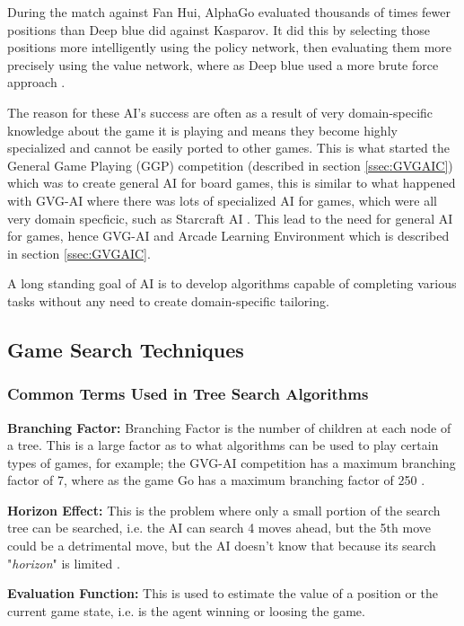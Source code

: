 \documentclass[journal]{IEEEtran}
\begin{document}
		During the match against Fan Hui, AlphaGo evaluated thousands of times fewer positions than Deep blue did against Kasparov. It did this by selecting those positions more intelligently using the policy network, then evaluating them more precisely using the value network, where as Deep blue used a more brute force approach \cite{silver2016mastering, DeepBlue}.

		The reason for these AI's success are often as a result of very domain-specific knowledge about the game it is playing and means they become highly specialized and cannot be easily ported to other games. 
		This is what started the General Game Playing (GGP) competition (described in section \ref{ssec:GVGAIC}) which was to create general AI for board games, this is similar to what happened with GVG-AI where there was lots of specialized AI for games, which were all very domain specficic, such as Starcraft AI \cite{ontanon2013survey, hingston2010new}.
		This lead to the need for general AI for games, hence GVG-AI and Arcade Learning Environment which is described in section \ref{ssec:GVGAIC}.
		
		A long standing goal of AI is to develop algorithms capable of completing various tasks without any need to create domain-specific tailoring.
		
	\subsection{Game Search Techniques} \label{ssec:GST}
		\subsubsection{Common Terms Used in Tree Search Algorithms} \label{sssec:Common}

		\textbf{Branching Factor:}
			Branching Factor is the number of children at each node of a tree. This is a large factor as to what algorithms can be used to play certain types of games, for example; the GVG-AI competition has a maximum branching factor of 7, where as the game Go has a maximum branching factor of 250 \cite{silver2016mastering, perez20162014}.

		\textbf{Horizon Effect:}
			This is the problem where only a small portion of the search tree can be searched, i.e. the AI can search 4 moves ahead, but the 5th move could be a detrimental move, but the AI doesn't know that because its search "\textit{horizon}" is limited \cite{joppen2017informed}.

		\textbf{Evaluation Function:}
			This is used to estimate the value of a position or the current game state, i.e. is the agent winning or loosing the game.
			
\end{document}
